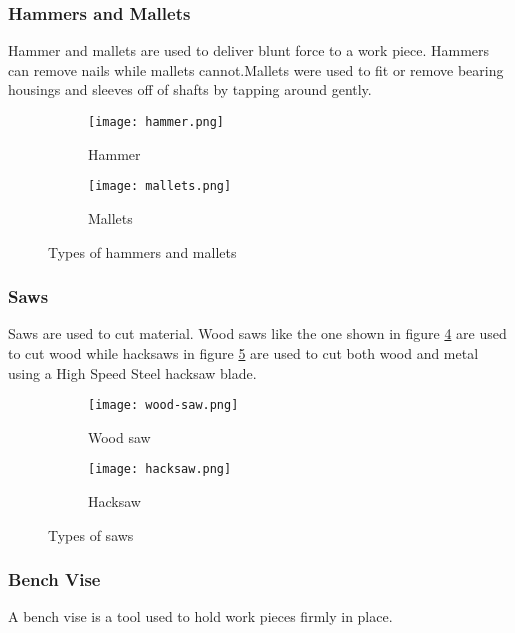\documentclass[a4paper,12pt]{article}
\begin{document}
				\subsubsection*{Hammers and Mallets}
					Hammer and mallets are used to deliver blunt force to a work piece. Hammers can remove nails while mallets cannot.Mallets were used to fit or remove bearing housings and sleeves off of shafts by tapping around gently.
					
					\begin{figure}[H]
					\centering
						\begin{subfigure}{0.5\textwidth}
							\centering				
							\texttt{[image: hammer.png]}
							\caption{Hammer}
							\label{subfig:hammer}
						\end{subfigure}
						\begin{subfigure}{0.5\textwidth}
							\centering				
							\texttt{[image: mallets.png]}
							\caption{Mallets}
							\label{subfig:mallets}
						\end{subfigure}
					\label{fig:hammers-and-mallets}
					\caption{Types of hammers and mallets}
					\end{figure}	
							
				\subsubsection*{Saws}
					Saws are used to cut material.
					Wood saws like the one shown in figure \ref{subfig:wood-saw} are used to cut wood while hacksaws in figure \ref{subfig:hacksaw} are used to cut both wood and metal using a High Speed Steel hacksaw blade.
								
					\begin{figure}[H]
					\centering
						\begin{subfigure}{0.5\textwidth}
							\centering				
							\texttt{[image: wood-saw.png]}
							\caption{Wood saw}
							\label{subfig:wood-saw}
						\end{subfigure}									
						\begin{subfigure}{0.5\textwidth}
							\centering				
							\texttt{[image: hacksaw.png]}
							\caption{Hacksaw}
							\label{subfig:hacksaw}
						\end{subfigure}
						\label{fig:saws}
						\caption{Types of saws}
					\end{figure}
				
				\newpage	
				\subsubsection*{Bench Vise}
					A bench vise is a tool used to hold work pieces firmly in place.
					
\end{document}
